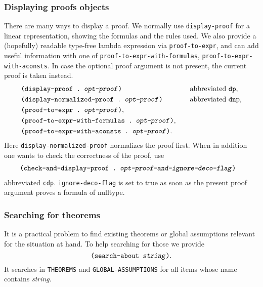 \documentclass[12pt]{amsart}
\begin{document}
\subsubsection{Displaying proofs objects}
There are many ways to display a proof.  We normally use
\texttt{display-proof} for a linear representation, showing the
formulas and the rules used.  We also provide a (hopefully) readable
type-free lambda expression via \texttt{proof-to-expr}, and can add
useful information with one of \texttt{proof-to-expr-with-formulas},
\texttt{proof-to-expr-with-aconsts}.  In case the optional proof
argument is not present, the current proof is taken instead.
\begin{alignat*}{2}
  &\texttt{(display-proof .\ \textsl{opt-proof})}
  \index{display-proof@\texttt{display-proof}}
  &\quad& \text{abbreviated \texttt{dp}\index{dp@\texttt{dp}}},
  \\
  &\texttt{(display-normalized-proof .\ \textsl{opt-proof})}
  \index{display-normalized-proof@\texttt{display-normalized-proof}}
  &\quad& \text{abbreviated \texttt{dnp}\index{dnp@\texttt{dnp}}},
  \\
  &\texttt{(proof-to-expr .\ \textsl{opt-proof})},%
  \index{proof-to-expr@\texttt{proof-to-expr}}
  \\
  &\texttt{(proof-to-expr-with-formulas .\ \textsl{opt-proof})},%
  \index{proof-to-expr-with-formulas@\texttt{proof-to-expr-with-formulas}}
  \\
  &\texttt{(proof-to-expr-with-aconsts .\ \textsl{opt-proof})}.%
  \index{proof-to-expr-with-aconsts@\texttt{proof-to-expr-with-aconsts}}
\end{alignat*}
Here \texttt{display-normalized-proof} normalizes the proof first.
When in addition one wants to check the
correctness of the proof, use
\begin{align*}
  &\texttt{(check-and-display-proof .\
    \textsl{opt-proof-and-ignore-deco-flag})}%
  \index{check-and-display-proof@\texttt{check-and-display-proof}}
\end{align*}
abbreviated \texttt{cdp}.
\texttt{ignore-deco-flag}
is set to true as soon as the present proof argument proves a formula
of nulltype.

\subsubsection{Searching for theorems}
It is a practical problem to find existing theorems or global
assumptions relevant for the situation at hand.  To help searching
for those we provide
\begin{equation*}
  \texttt{(search-about \textsl{string})}.%
  \index{search-about@\texttt{search-about}}
\end{equation*}
It searches in \texttt{THEOREMS} and
\texttt{GLOBAL-ASSUMPTIONS}%
 for all items
whose name contains \textsl{string}.
\end{document}
